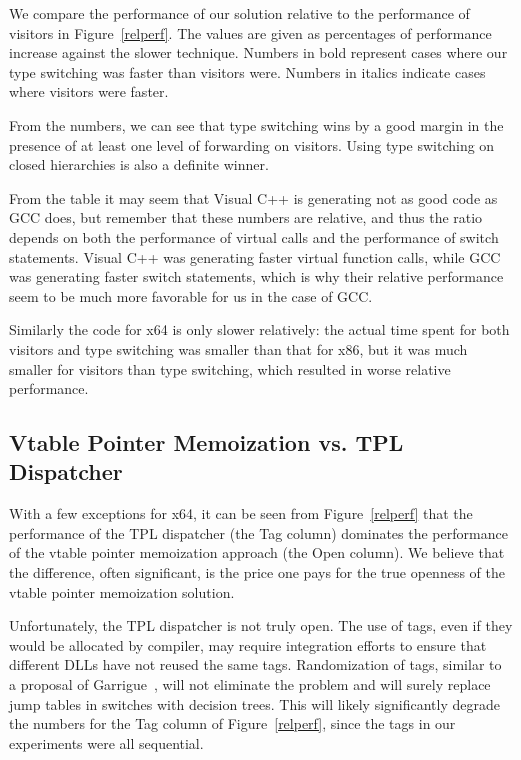 \documentclass[preprint]{sigplanconf}
\begin{document}
We compare the performance of our solution relative to the performance of visitors in 
Figure~\ref{relperf}. The values are given as percentages of performance increase 
against the slower technique. Numbers in bold represent cases where our type 
switching was faster than visitors were. Numbers in italics indicate cases where 
visitors were faster.

From the numbers, we can see that type switching wins by a good margin in 
the presence of at least one level of forwarding on visitors. Using type 
switching on closed hierarchies is also a definite winner.

From the table it may seem that Visual C++ is generating not as good code as GCC 
does, but remember that these numbers are relative, and thus the ratio depends on  
both the performance of virtual calls and the performance of switch statements. Visual 
C++ was generating faster virtual function calls, while GCC was generating 
faster switch statements, which is why their relative performance seem to be much 
more favorable for us in the case of GCC.

Similarly the code for x64 is only slower relatively: the actual time spent for 
both visitors and type switching was smaller than that for x86, but it was much 
smaller for visitors than type switching, which resulted in worse relative 
performance.

\subsection{Vtable Pointer Memoization vs. TPL Dispatcher}
\label{sec:cmp}

With a few exceptions for x64, it can be seen from Figure~\ref{relperf} 
that the performance of the TPL dispatcher (the Tag column) dominates the 
performance of the vtable pointer memoization approach (the Open column). We believe 
that the difference, often significant, is the price one pays for the true 
openness of the vtable pointer memoization solution.

Unfortunately, the TPL dispatcher is not truly open. The use of tags, 
even if they would be allocated by compiler, may require integration efforts to 
ensure that different DLLs have not reused the same tags. Randomization of tags,
similar to a proposal of Garrigue~\cite{garrigue-98}, will not eliminate the 
problem and will surely replace jump tables in switches with decision trees. This 
will likely significantly degrade the numbers for the Tag column of 
Figure~\ref{relperf}, since the tags in our experiments were all sequential.
\end{document}
